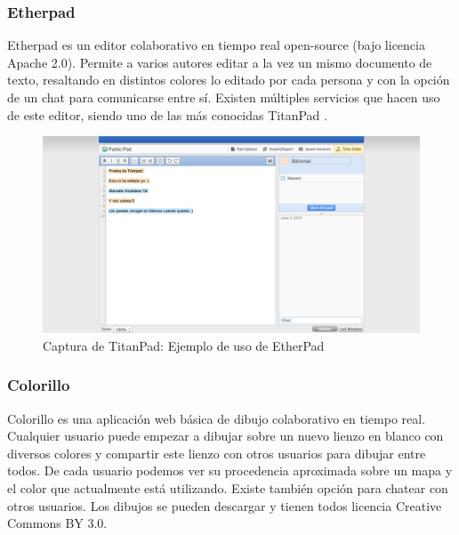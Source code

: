 	\subsubsection{Etherpad}
	
	Etherpad \cite{ref:etherpad} es un editor colaborativo en tiempo real open-source (bajo licencia Apache 2.0). Permite a varios autores editar a la vez un mismo documento de texto, resaltando en distintos colores lo editado por cada persona y con la opción de un chat para comunicarse entre sí. Existen múltiples servicios que hacen uso de este editor, siendo uno de las más conocidas TitanPad \cite{ref:titanpad}.
	
	\begin{figure}[H]
		\centering
			\includegraphics[keepaspectratio, scale=0.30]{Media/Captures/titanpadWeb.png}
		\caption{Captura de TitanPad: Ejemplo de uso de EtherPad}
		\label{fig:titanpad}
	\end{figure} 	
	
	\subsubsection{Colorillo}
	
	Colorillo \cite{ref:colorillo} es una aplicación web básica de dibujo colaborativo en tiempo real. Cualquier usuario puede empezar a dibujar sobre un nuevo lienzo en blanco con diversos colores y compartir este lienzo con otros usuarios para dibujar entre todos. De cada usuario podemos ver su procedencia aproximada sobre un mapa y el color que actualmente está utilizando. Existe también opción para chatear con otros usuarios. Los dibujos se pueden descargar y tienen todos licencia Creative Commons BY 3.0.
	
